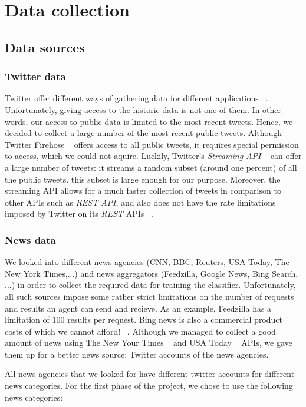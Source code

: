 \documentclass{llncs}
\begin{document}
\section{Data collection}
\subsection{Data sources}
\subsubsection{Twitter data}
Twitter offer different ways of gathering data for different applications ~\cite{twitterdocumentation}. Unfortunately, giving access to the historic data is not one of them. In other words, our access to public data is limited to the most recent tweets. Hence, we decided to collect a large number of the most recent public tweets. 
Although Twitter Firehose ~\cite{twitterrestapi} offers access to all public tweets, it requires special permission to access, which we could not aquire. Luckily, Twitter's \textit{Streaming API} ~\cite{twitterstreaming} can offer a large number of tweets: it streams a random subset (around one percent) of all the public tweets. this subset is large enough for our purpose. Moreover, the streaming API allows for a much faster collection of tweets in comparison to other APIs such as \textit{REST API}, and also does not have the rate limitations imposed by Twitter on its \textit{REST} APIs ~\cite{twitterdocumentation}. 


\subsubsection{News data}
We looked into different news agencies (CNN, BBC, Reuters, USA Today, The New York Times,...) and news aggregators (Feedzilla, Google News, Bing Search, ...) in order to collect the required data for training the classifier. Unfortunately, all such sources impose some rather strict limitations on the number of requests and results an agent can send and recieve. As an example, Feedzilla has a limitation of 100 results per request. Bing news is also a commercial product costs of which we cannot afford! ~\cite{bingsearchapi}. Although we managed to collect a good amount of news using The New Your Times ~\cite{thenytimes} and USA Today ~\cite{thenytimes} APIs, we gave them up for a better news source: Twitter accounts of the news agencies. 

All news agencies that we looked for have different twitter accounts for different news categories. For the first phase of the project, we chose to use the following news categories:
\end{document}
